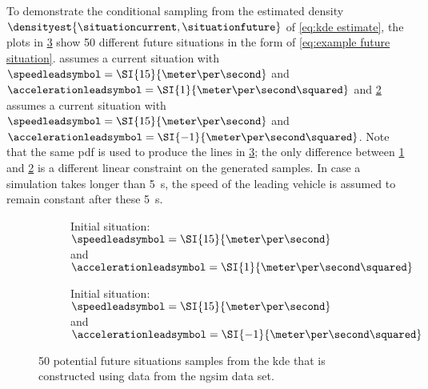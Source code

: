 To demonstrate the conditional sampling from the estimated density $\densityest{\situationcurrent,\situationfuture}$ of \cref{eq:kde estimate}, the plots in \cref{fig:speed profiles} show 50 different future situations in the form of \cref{eq:example future situation}.
 assumes a current situation with $\speedleadsymbol=\SI{15}{\meter\per\second}$ and $\accelerationleadsymbol=\SI{1}{\meter\per\second\squared}$ and \cref{fig:speed profiles decelerating} assumes a current situation with $\speedleadsymbol=\SI{15}{\meter\per\second}$ and $\accelerationleadsymbol=\SI{-1}{\meter\per\second\squared}$.
Note that the same \ac{pdf} is used to produce the lines in \cref{fig:speed profiles}; the only difference between \cref{fig:speed profiles accelerating} and \cref{fig:speed profiles decelerating} is a different linear constraint on the generated samples.
In case a simulation takes longer than \SI{5}{\second}, the speed of the leading vehicle is assumed to remain constant after these \SI{5}{\second}.

\setlength{\figurewidth}{.49\linewidth}
\setlength{\figureheight}{.7\figurewidth}
\begin{figure}
	\centering
	\begin{subfigure}{.49\linewidth}
		\centering
		
		\caption{Initial situation: $\speedleadsymbol=\SI{15}{\meter\per\second}$ and $\accelerationleadsymbol=\SI{1}{\meter\per\second\squared}$}
		\label{fig:speed profiles accelerating}
	\end{subfigure}
	\begin{subfigure}{.49\linewidth}
		\centering
		
		\caption{Initial situation: $\speedleadsymbol=\SI{15}{\meter\per\second}$ and $\accelerationleadsymbol=\SI{-1}{\meter\per\second\squared}$}
		\label{fig:speed profiles decelerating}
	\end{subfigure}
	\caption{50 potential future situations samples from the \ac{kde} that is constructed using data from the \ac{ngsim} data set.}
	\label{fig:speed profiles}
\end{figure}

